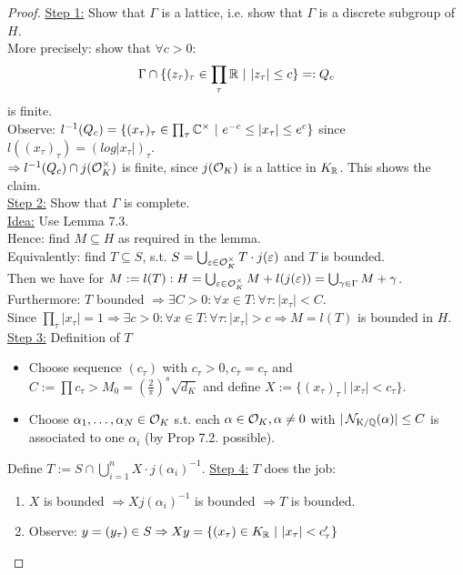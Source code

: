 \begin{proof}
\underline{Step 1:} Show that $\Gamma$ is a lattice, i.e. show that $\Gamma$ is a discrete subgroup of $H$.\\
More precisely: show that $\forall c > 0:$
\[ \Gamma \cap \{(z_\tau)_\tau \in \prod_\tau \mathbb{R} \ | \ |z_\tau| \leq c \} =: Q_c\]
is finite.\\
Observe: $l^{-1}(Q_c) = \{(x_\tau)_\tau \in \prod_\tau \mathbb{C}^\times \ | \ e^{-c} \leq |x_\tau| \leq e^c\}$ since $l((x_\tau)_\tau)=(log|x_\tau|)_\tau$.\\
$\Rightarrow l^{-1}(Q_c) \cap j(\mathcal{O}^\times_K)$ is finite, since $j(\mathcal{O}_K)$ is a lattice in $K_{\mathbb{R}}$. This shows the claim.\\
\underline{Step 2:} Show that $\Gamma$ is complete.\\
\underline{Idea:} Use Lemma 7.3.\\
Hence: find $M \subseteq H$ as required in the lemma.\\
Equivalently: find $T \subseteq S$, s.t. $S = \bigcup_{\varepsilon \in \mathcal{O}^\times_K} T\cdot j(\varepsilon)$ and $T$ is bounded.\\
Then we have for $M:= l(T): H= \bigcup_{\varepsilon \in \mathcal{O}^\times_K} M + l(j(\varepsilon)) = \bigcup_{\gamma \in \Gamma} M + \gamma$.\\
Furthermore: $T$ bounded $\Rightarrow \exists C >0 : \forall x \in T: \forall \tau: |x_\tau| <C$.\\
Since $\prod_\tau |x_\tau| =1 \Rightarrow \exists c >0: \forall x \in T: \forall \tau: | x_\tau| >c \Rightarrow M=l(T)$ is bounded in $H$.\\
\underline{Step 3:} Definition of $T$
\begin{itemize}
\item Choose sequence $(c_\tau)$ with $c_\tau >0, c_{\bar{\tau}}=c_\tau$ and $C:=\prod c_\tau >M_0= (\frac{2}{\pi})^s \sqrt{d_K}$ and define $X:= \{ (x_\tau)_\tau \ | \ | x_\tau| < c_\tau\}$.
\item Choose $\alpha_1, \dots, \alpha_N \in \mathcal{O}_K$ s.t. each $\alpha \in \mathcal{O}_K, \alpha \neq 0$ with $|\operatorname{\mathcal{N}_{K/\mathbb{Q}}}(\alpha)| \leq C$ is associated to one $\alpha_i$ (by Prop 7.2. possible).
\end{itemize}
Define $T:= S \cap \bigcup_{i=1}^n X \cdot j(\alpha_i)^{-1}$.
\underline{Step 4:} $T$ does the job:
\begin{enumerate}[(1)]
\item $X$ is bounded $\Rightarrow X j(\alpha_i)^{-1}$ is bounded $\Rightarrow T$ is bounded.
\item Observe: $y=(y_\tau) \in S \Rightarrow Xy=\{(x_\tau) \in K_{\mathbb{R}} \ | \ |x_\tau| < c'_\tau\}$

\end{enumerate}
\end{proof}
